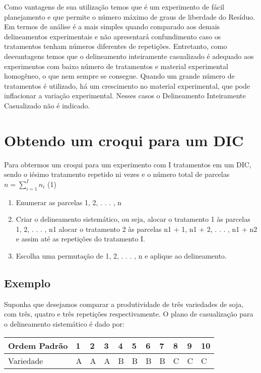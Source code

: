 \documentclass[
]{book}
\providecommand{\tightlist}{%
  \setlength{\itemsep}{0pt}\setlength{\parskip}{0pt}}
\begin{document}
Como vantagens de sua utilização temos que é um experimento de fácil planejamento e que permite o número máximo de graus de liberdade do Resíduo. Em termos de análise é a mais simples quando comparado aos demais delineamentos experimentais e não apresentará confundimento caso os tratamentos tenham números diferentes de repetições. Entretanto, como desvantagens temos que o delineamento inteiramente casualizado é adequado aos experimentos com baixo número de tratamentos e material experimental homogêneo, o que nem sempre se consegue. Quando um grande número de tratamentos é utilizado, há um crescimento no material experimental, que pode inflacionar a variação experimental. Nesses casos o Delineamento Inteiramente Casualizado não é indicado.

\hypertarget{obtendo-um-croqui-para-um-dic}{%
\section{Obtendo um croqui para um DIC}\label{obtendo-um-croqui-para-um-dic}}

Para obtermos um croqui para um experimento com I tratamentos em um DIC, sendo o iésimo tratamento repetido ni vezes e o número total de parcelas \(n=\sum_{i=1}^I n_i\) (1)

\begin{enumerate}
\def\labelenumi{(\roman{enumi})}
\tightlist
\item
  Enumerar as parcelas 1, 2, . . . , n
\item
  Criar o delineamento sistemático, ou seja,
  alocar o tratamento 1 às parcelas 1, 2, . . . , n1
  alocar o tratamento 2 às parcelas n1 + 1, n1 + 2, . . . , n1 + n2
  e assim até as repetições do tratamento I.
\item
  Escolha uma permutação de 1, 2, . . . , n e aplique ao delineamento.
\end{enumerate}

\hypertarget{exemplo}{%
\subsection{Exemplo}\label{exemplo}}

Suponha que desejamos comparar a produtividade de três variedades de soja, com três, quatro e três repetições respectivamente. O plano de casualização para o delineamento sistemático é dado por:

\begin{longtable}[]{@{}lllllllllll@{}}
\toprule()
Ordem Padrão & 1 & 2 & 3 & 4 & 5 & 6 & 7 & 8 & 9 & 10 \\
\midrule()
\endhead
Variedade & A & A & A & B & B & B & B & C & C & C \\
\bottomrule()
\end{longtable}
\end{document}
